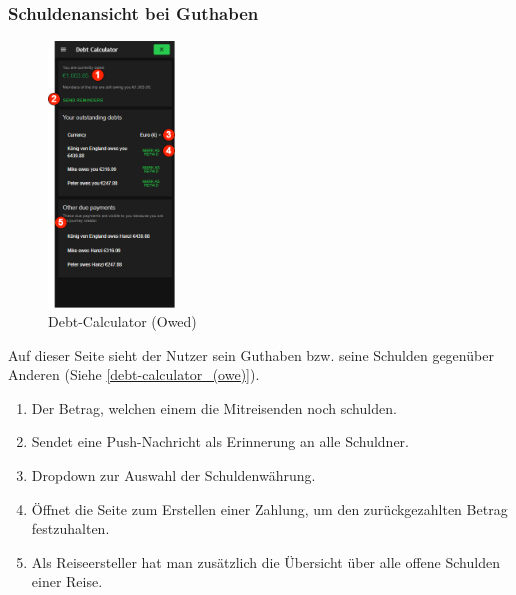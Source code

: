 \subsubsection{Schuldenansicht bei Guthaben}\label{debt-calculator_(owed)}
\begin{figure}[H]
	\centering
	\includegraphics[width=0.3\textwidth]{img/pages_numbers/debt-calculator_(owed).drawio}
	\caption[Debt-Calculator (Owed)]{Debt-Calculator (Owed)}
	\label{fig:debt-calculator_(owed)}
\end{figure}
Auf dieser Seite sieht der Nutzer sein Guthaben bzw. seine Schulden gegenüber Anderen (Siehe \ref{debt-calculator_(owe)}).
\begin{enumerate}[label=\protect\circled{\arabic*}]
	\item Der Betrag, welchen einem die Mitreisenden noch schulden.
	\item Sendet eine Push-Nachricht als Erinnerung an alle Schuldner.
	\item Dropdown zur Auswahl der Schuldenwährung.
	\item Öffnet die Seite zum Erstellen einer Zahlung, um den zurückgezahlten Betrag festzuhalten.
	\item Als Reiseersteller hat man zusätzlich die Übersicht über alle offene Schulden einer Reise.
\end{enumerate}


